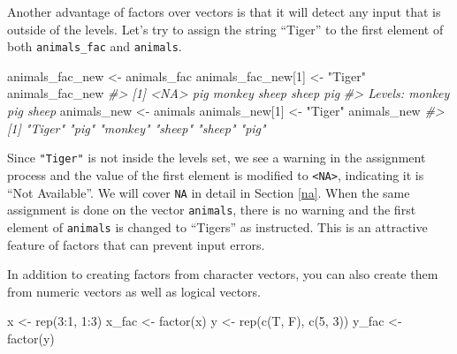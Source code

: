 \documentclass[
]{book}
\newenvironment{Shaded}{\begin{snugshade}}{\end{snugshade}}
\newcommand{\CommentTok}[1]{\textcolor[rgb]{0.56,0.35,0.01}{\textit{#1}}}
\newcommand{\DecValTok}[1]{\textcolor[rgb]{0.00,0.00,0.81}{#1}}
\newcommand{\FunctionTok}[1]{\textcolor[rgb]{0.00,0.00,0.00}{#1}}
\newcommand{\NormalTok}[1]{#1}
\newcommand{\OtherTok}[1]{\textcolor[rgb]{0.56,0.35,0.01}{#1}}
\newcommand{\SpecialCharTok}[1]{\textcolor[rgb]{0.00,0.00,0.00}{#1}}
\newcommand{\StringTok}[1]{\textcolor[rgb]{0.31,0.60,0.02}{#1}}
\begin{document}
Another advantage of factors over vectors is that it will detect any input that is outside of the levels. Let's try to assign the string ``Tiger'' to the first element of both \texttt{animals\_fac} and \texttt{animals}.

\begin{Shaded}
\begin{Highlighting}[]
\NormalTok{animals\_fac\_new }\OtherTok{\textless{}{-}}\NormalTok{ animals\_fac}
\NormalTok{animals\_fac\_new[}\DecValTok{1}\NormalTok{] }\OtherTok{\textless{}{-}} \StringTok{"Tiger"}
\NormalTok{animals\_fac\_new}
\CommentTok{\#\textgreater{} [1] \textless{}NA\textgreater{}   pig    monkey sheep  sheep  pig   }
\CommentTok{\#\textgreater{} Levels: monkey pig sheep}
\NormalTok{animals\_new }\OtherTok{\textless{}{-}}\NormalTok{ animals}
\NormalTok{animals\_new[}\DecValTok{1}\NormalTok{] }\OtherTok{\textless{}{-}} \StringTok{"Tiger"}
\NormalTok{animals\_new}
\CommentTok{\#\textgreater{} [1] "Tiger"  "pig"    "monkey" "sheep"  "sheep"  "pig"}
\end{Highlighting}
\end{Shaded}

Since \texttt{"Tiger"} is not inside the levels set, we see a warning in the assignment process and the value of the first element is modified to \texttt{\textless{}NA\textgreater{}}, indicating it is ``Not Available''. We will cover \texttt{NA} in detail in Section \ref{na}. When the same assignment is done on the vector \texttt{animals}, there is no warning and the first element of \texttt{animals} is changed to ``Tigers'' as instructed. This is an attractive feature of factors that can prevent input errors.

In addition to creating factors from character vectors, you can also create them from numeric vectors as well as logical vectors.

\begin{Shaded}
\begin{Highlighting}[]
\NormalTok{x }\OtherTok{\textless{}{-}} \FunctionTok{rep}\NormalTok{(}\DecValTok{3}\SpecialCharTok{:}\DecValTok{1}\NormalTok{, }\DecValTok{1}\SpecialCharTok{:}\DecValTok{3}\NormalTok{)}
\NormalTok{x\_fac }\OtherTok{\textless{}{-}} \FunctionTok{factor}\NormalTok{(x)}
\NormalTok{y }\OtherTok{\textless{}{-}} \FunctionTok{rep}\NormalTok{(}\FunctionTok{c}\NormalTok{(T, F), }\FunctionTok{c}\NormalTok{(}\DecValTok{5}\NormalTok{, }\DecValTok{3}\NormalTok{))}
\NormalTok{y\_fac }\OtherTok{\textless{}{-}} \FunctionTok{factor}\NormalTok{(y)}
\end{Highlighting}
\end{Shaded}
\end{document}
